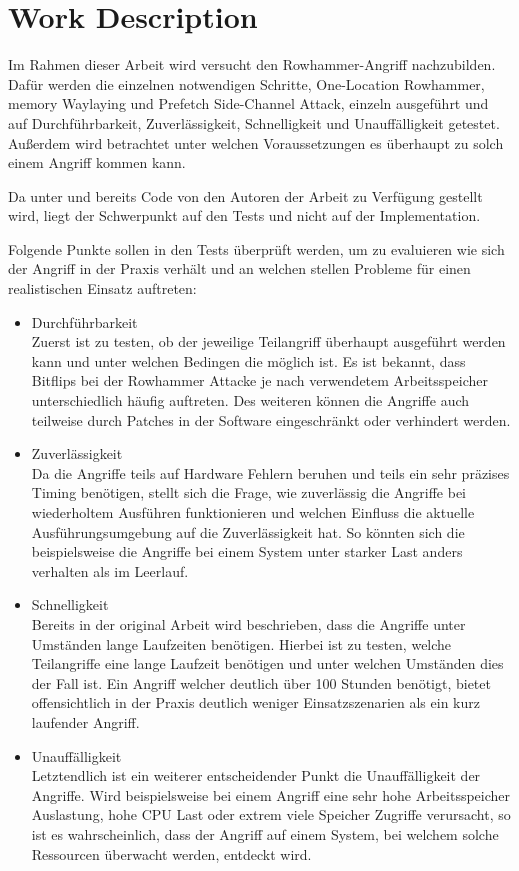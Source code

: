 \documentclass[conference]{IEEEtran}
\begin{document}
\section{Work Description}
Im Rahmen dieser Arbeit wird versucht den Rowhammer-Angriff nachzubilden. Dafür werden die einzelnen notwendigen Schritte, One-Location Rowhammer, memory Waylaying und Prefetch Side-Channel Attack, einzeln ausgeführt und auf Durchführbarkeit, Zuverlässigkeit, Schnelligkeit und Unauffälligkeit getestet. Außerdem wird betrachtet unter welchen Voraussetzungen es überhaupt zu solch einem Angriff kommen kann.

Da unter \cite{git-rowhammer} und \cite{git-prefetch} bereits Code von den Autoren der Arbeit \cite{DBLP:journals/corr/abs-1710-00551} zu Verfügung gestellt wird, liegt der Schwerpunkt auf den Tests und nicht auf der Implementation.

Folgende Punkte sollen in den Tests überprüft werden, um zu evaluieren wie sich der Angriff in der Praxis verhält und an welchen stellen Probleme für einen realistischen Einsatz auftreten:

\begin{itemize}
	\item Durchführbarkeit ~\\
	Zuerst ist zu testen, ob der jeweilige Teilangriff überhaupt ausgeführt werden kann und unter welchen Bedingen die möglich ist. Es ist bekannt, dass Bitflips bei der Rowhammer Attacke je nach verwendetem Arbeitsspeicher unterschiedlich häufig auftreten. Des weiteren können die Angriffe auch teilweise durch Patches in der Software eingeschränkt oder verhindert werden.
	
	\item Zuverlässigkeit ~\\
	Da die Angriffe teils auf Hardware Fehlern beruhen und teils ein sehr präzises Timing benötigen, stellt sich die Frage, wie zuverlässig die Angriffe bei wiederholtem Ausführen funktionieren und welchen Einfluss die aktuelle Ausführungsumgebung auf die Zuverlässigkeit hat. So könnten sich die beispielsweise die Angriffe bei einem System unter starker Last anders verhalten als im Leerlauf.
	
	\item Schnelligkeit ~\\
	Bereits in der original Arbeit wird beschrieben, dass die Angriffe unter Umständen lange Laufzeiten benötigen. Hierbei ist zu testen, welche Teilangriffe eine lange Laufzeit benötigen und unter welchen Umständen dies der Fall ist. Ein Angriff welcher deutlich über 100 Stunden benötigt, bietet offensichtlich in der Praxis deutlich weniger Einsatzszenarien als ein kurz laufender Angriff.
	
	\item Unauffälligkeit ~\\
	Letztendlich ist ein weiterer entscheidender Punkt die Unauffälligkeit der Angriffe. Wird beispielsweise bei einem Angriff eine sehr hohe Arbeitsspeicher Auslastung, hohe CPU Last oder extrem viele Speicher Zugriffe verursacht, so ist es wahrscheinlich, dass der Angriff auf einem System, bei welchem solche Ressourcen überwacht werden, entdeckt wird.
	
\end{itemize}
\end{document}
